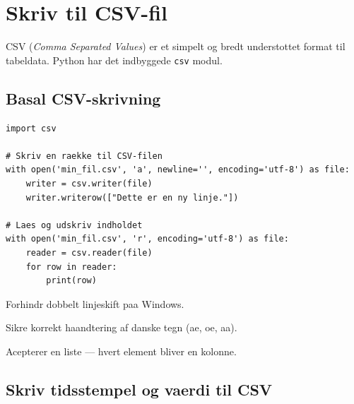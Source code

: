 \documentclass[12pt, a4paper]{article}
\begin{document}
\clearpage
\section{Skriv til CSV-fil}

CSV (\textit{Comma Separated Values}) er et simpelt og bredt understottet format
til tabeldata. Python har det indbyggede \texttt{csv} modul.

\subsection{Basal CSV-skrivning}

\begin{tcolorbox}[pythonbox, title={\faPython\quad Kode 4 --- Skriv og laes en CSV-fil}]
\begin{verbatim}
import csv

# Skriv en raekke til CSV-filen
with open('min_fil.csv', 'a', newline='', encoding='utf-8') as file:
    writer = csv.writer(file)
    writer.writerow(["Dette er en ny linje."])

# Laes og udskriv indholdet
with open('min_fil.csv', 'r', encoding='utf-8') as file:
    reader = csv.reader(file)
    for row in reader:
        print(row)
\end{verbatim}
\end{tcolorbox}

\begin{tcolorbox}[infobox, title={\faInfoCircle\quad Parametre til \texttt{open()} ved CSV}]
\begin{description}[leftmargin=3.5cm, style=nextline]
  \item[\texttt{newline=''}]  Forhindr dobbelt linjeskift paa Windows.
  \item[\texttt{encoding='utf-8'}]  Sikre korrekt haandtering af danske tegn (ae, oe, aa).
  \item[\texttt{writer.writerow([ ])}]  Acepterer en liste --- hvert element bliver en kolonne.
\end{description}
\end{tcolorbox}

\subsection{Skriv tidsstempel og vaerdi til CSV}
\end{document}
